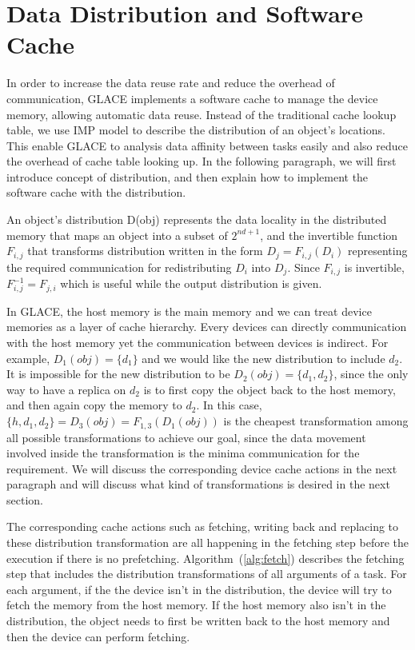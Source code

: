\documentclass[preprint,11pt]{elsarticle}
\begin{document}
\section{Data Distribution and Software Cache}
  In order to increase the data reuse rate and reduce the overhead of communication, GLACE
  implements a software cache to manage the device memory, allowing automatic data reuse. 
  Instead of the traditional cache lookup table, we use IMP model \cite{} to describe the distribution 
  of an object's locations. This enable GLACE to analysis data affinity between tasks easily and 
  also reduce the overhead of cache table looking up. In the following paragraph, we will first 
  introduce concept of distribution, and then explain how to implement the software cache with
  the distribution.    
  
  An object's distribution D(obj) represents the data locality in the distributed memory that maps 
  an object into a subset of $2^{nd+1}$, and the invertible function $F_{i,j}$ that transforms 
  distribution written in the form $D_j = F_{i, j}(D_i)$ representing 
  the required communication for redistributing $D_i$ into $D_j$. Since $F_{i, j}$ is invertible,
  $F_{i, j}^{-1} = F_{j, i}$ which is useful while the output distribution is given.  
  
  In GLACE, the host memory is the main memory and we can treat device memories as a 
  layer of cache hierarchy. Every devices can directly communication with the host memory 
  yet the communication between devices is indirect. For example, $D_1(obj) = \{d_1\}$ and 
  we would like the new distribution to include $d_2$. It is impossible for the new distribution
  to be $D_2(obj) = \{d_1, d_2\}$, since the only way to have a replica on $d_2$ is to 
  first copy the object back to the host memory, and then again copy the memory to $d_2$.
  In this case, $\{h, d_1, d_2\} = D_3(obj) = F_{1, 3}(D_1(obj))$ is the cheapest transformation
  among all possible transformations to achieve our goal, since the data movement involved 
  inside the transformation is the minima communication for the requirement.
  We will discuss the corresponding device cache actions in the next paragraph and will discuss 
  what kind of transformations is desired in the next section. 
  
  The corresponding cache actions such as fetching, writing back and replacing to these 
  distribution transformation are all happening in the fetching step before the execution if 
  there is no prefetching. Algorithm~(\ref{alg:fetch}) describes the fetching step that includes the
  distribution transformations of all arguments of a task. For each argument, if the the device
  isn't in the distribution, the device will try to fetch the memory from the host memory.
  If the host memory also isn't in the distribution, the object needs to first be written back to
  the host memory and then the device can perform fetching. 
   
\end{document}
